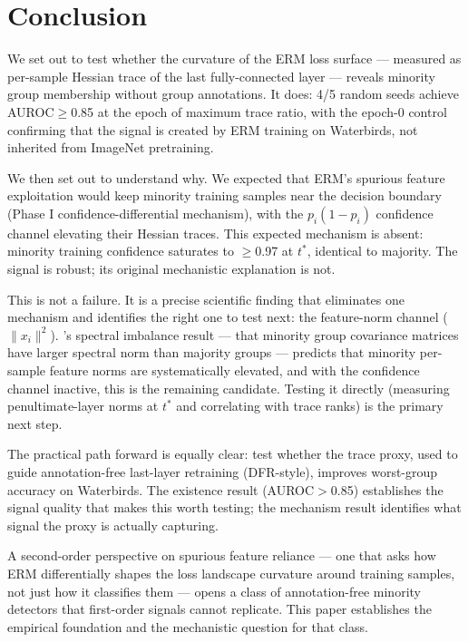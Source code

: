 \section{Conclusion}
\label{sec:conclusion}

We set out to test whether the curvature of the ERM loss surface --- measured as per-sample Hessian trace of the last fully-connected layer --- reveals minority group membership without group annotations. It does: 4/5 random seeds achieve AUROC$\geq$0.85 at the epoch of maximum trace ratio, with the epoch-0 control confirming that the signal is created by ERM training on Waterbirds, not inherited from ImageNet pretraining.

We then set out to understand why. We expected that ERM's spurious feature exploitation would keep minority training samples near the decision boundary (Phase I confidence-differential mechanism), with the $p_i(1-p_i)$ confidence channel elevating their Hessian traces. This expected mechanism is absent: minority training confidence saturates to $\geq$0.97 at $t^*$, identical to majority. The signal is robust; its original mechanistic explanation is not.

This is not a failure. It is a precise scientific finding that eliminates one mechanism and identifies the right one to test next: the feature-norm channel ($\|x_i\|^2$). \cite{labonte2024spectral}'s spectral imbalance result --- that minority group covariance matrices have larger spectral norm than majority groups --- predicts that minority per-sample feature norms are systematically elevated, and with the confidence channel inactive, this is the remaining candidate. Testing it directly (measuring penultimate-layer norms at $t^*$ and correlating with trace ranks) is the primary next step.

The practical path forward is equally clear: test whether the trace proxy, used to guide annotation-free last-layer retraining (DFR-style), improves worst-group accuracy on Waterbirds. The existence result (AUROC$>$0.85) establishes the signal quality that makes this worth testing; the mechanism result identifies what signal the proxy is actually capturing.

A second-order perspective on spurious feature reliance --- one that asks how ERM differentially shapes the loss landscape curvature around training samples, not just how it classifies them --- opens a class of annotation-free minority detectors that first-order signals cannot replicate. This paper establishes the empirical foundation and the mechanistic question for that class.

